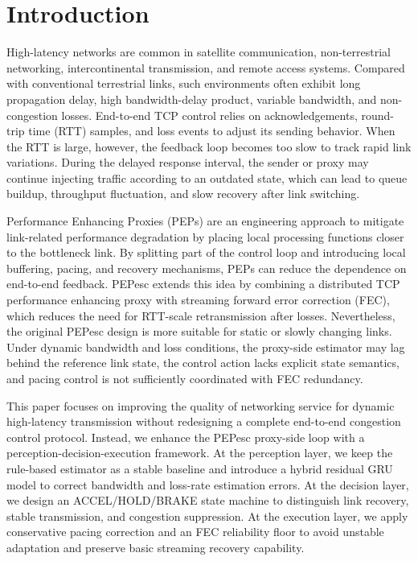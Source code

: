 \section{Introduction}
\label{sec:introduction}

High-latency networks are common in satellite communication, non-terrestrial networking, intercontinental transmission, and remote access systems. Compared with conventional terrestrial links, such environments often exhibit long propagation delay, high bandwidth-delay product, variable bandwidth, and non-congestion losses. End-to-end TCP control relies on acknowledgements, round-trip time (RTT) samples, and loss events to adjust its sending behavior. When the RTT is large, however, the feedback loop becomes too slow to track rapid link variations. During the delayed response interval, the sender or proxy may continue injecting traffic according to an outdated state, which can lead to queue buildup, throughput fluctuation, and slow recovery after link switching.

Performance Enhancing Proxies (PEPs) are an engineering approach to mitigate link-related performance degradation by placing local processing functions closer to the bottleneck link. By splitting part of the control loop and introducing local buffering, pacing, and recovery mechanisms, PEPs can reduce the dependence on end-to-end feedback. PEPesc extends this idea by combining a distributed TCP performance enhancing proxy with streaming forward error correction (FEC), which reduces the need for RTT-scale retransmission after losses. Nevertheless, the original PEPesc design is more suitable for static or slowly changing links. Under dynamic bandwidth and loss conditions, the proxy-side estimator may lag behind the reference link state, the control action lacks explicit state semantics, and pacing control is not sufficiently coordinated with FEC redundancy.

This paper focuses on improving the quality of networking service for dynamic high-latency transmission without redesigning a complete end-to-end congestion control protocol. Instead, we enhance the PEPesc proxy-side loop with a perception-decision-execution framework. At the perception layer, we keep the rule-based estimator as a stable baseline and introduce a hybrid residual GRU model to correct bandwidth and loss-rate estimation errors. At the decision layer, we design an ACCEL/HOLD/BRAKE state machine to distinguish link recovery, stable transmission, and congestion suppression. At the execution layer, we apply conservative pacing correction and an FEC reliability floor to avoid unstable adaptation and preserve basic streaming recovery capability.

